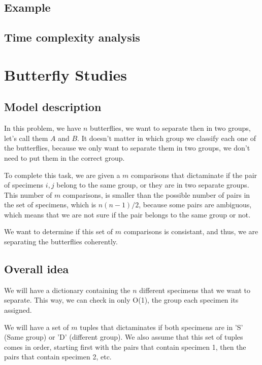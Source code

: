\documentclass{article}
\begin{document}
\subsection*{Example}

\subsection*{Time complexity analysis}

\section*{Butterfly Studies}

\subsection*{Model description}

In this problem, we have $n$ butterflies, we want to separate then in two groups, let's call them $A$ and $B$. It doesn't matter in which group we classify each one of the butterflies, because we only want to separate them in two groups, we don't need to put them in the correct group.

To complete this task, we are given a $m$ comparisons that dictaminate if the pair of specimens $i,j$ belong to the same group, or they are in two separate groups. This number of $m$ comparisons, is smaller than the possible number of pairs in the set of specimens, which is $n(n-1)/2$, because some pairs are ambiguous, which means that we are not sure if the pair belongs to the same group or not.

We want to determine if this set of $m$ comparisons is consistant, and thus, we are separating the butterflies coherently.

\subsection*{Overall idea}

We will have a dictionary containing the $n$ different specimens that we want to separate. This way, we can check in only O(1), the group each specimen its assigned.

We will have a set of $m$ tuples that dictaminates if both specimens are in 'S' (Same group) or 'D' (different group). We also assume that this set of tuples comes in order, starting first with the pairs that contain specimen 1, then the pairs that contain specimen 2, etc.
\end{document}

